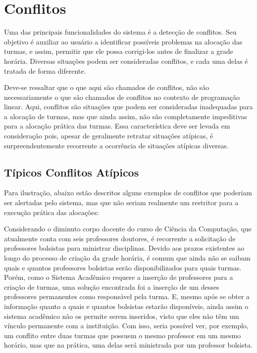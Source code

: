 \section{Conflitos}\label{sec:conflitos} %

Uma das principais funcionalidades do sistema é a detecção de conflitos. Seu objetivo é auxiliar ao usuário a identificar possíveis problemas na alocação das turmas, e assim, permitir que ele possa corrigi-los antes de finalizar a grade horária. Diversas situações podem ser consideradas conflitos, e cada uma delas é tratada de forma diferente.

Deve-se ressaltar que o que aqui são chamados de conflitos, não são necessariamente o que são chamados de conflitos no contexto de programação linear. Aqui, conflitos são situações que podem ser consideradas inadequadas para a alocação de turmas, mas que ainda assim, não são completamente impeditivas para a alocação prática das turmas. Essa característica deve ser levada em consideração pois, apesar de geralmente retratar situações atípicas, é surpreendentemente recorrente a ocorrência de situações atípicas diversas.

\subsection{Típicos Conflitos Atípicos}

Para ilustração, abaixo estão descritos alguns exemplos de conflitos que poderiam ser alertadas pelo sistema, mas que não seriam realmente um restritor para a execução prática das alocações:

Considerando o diminuto corpo docente do curso de Ciência da Computação, que atualmente conta com seis professores doutores, é recorrente a solicitação de professores bolsistas para ministrar disciplinas. Devido aos prazos existentes ao longo do processo de criação da grade horária, é comum que ainda não se saibam quais e quantos professores bolsistas serão disponibilizados para quais turmas. Porém, como o Sistema Acadêmico requere a inserção de professores para a criação de turmas, uma solução encontrada foi a inserção de um desses professores permanentes como responsável pela turma. E, mesmo após se obter a informação quanto a quais e quantos bolsistas estarão disponíveis, ainda assim o sistema acadêmico não os permite serem inseridos, visto que eles não têm um vínculo permanente com a instituição. Com isso, seria possível ver, por exemplo, um conflito entre duas turmas que possuem o mesmo professor em um mesmo horário, mas que na prática, uma delas será ministrada por um professor bolsista.

